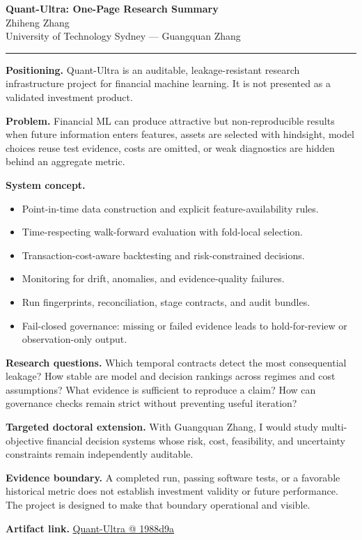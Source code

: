 \documentclass[11pt]{article}
\makeatletter
\newcommand{\ApplicantName}{Zhiheng Zhang}
\newcommand{\ApplicantGitHub}{\href{https://github.com/zhiheng-zhang-Mera/Quant-Ultra/tree/1988d9a8530da91a8158de864d098ea869098923}{Quant-Ultra @ 1988d9a}}
\makeatother
\begin{document}
\begin{center}
{\LARGE\bfseries Quant-Ultra: One-Page Research Summary}\\[0.25em]
{\large \ApplicantName}\\
University of Technology Sydney --- Guangquan Zhang
\end{center}
\vspace{0.35em}\hrule\vspace{0.65em}

\textbf{Positioning.} Quant-Ultra is an auditable, leakage-resistant research infrastructure project for financial machine learning. It is not presented as a validated investment product.

\textbf{Problem.} Financial ML can produce attractive but non-reproducible results when future information enters features, assets are selected with hindsight, model choices reuse test evidence, costs are omitted, or weak diagnostics are hidden behind an aggregate metric.

\textbf{System concept.}
\begin{itemize}
\item Point-in-time data construction and explicit feature-availability rules.
\item Time-respecting walk-forward evaluation with fold-local selection.
\item Transaction-cost-aware backtesting and risk-constrained decisions.
\item Monitoring for drift, anomalies, and evidence-quality failures.
\item Run fingerprints, reconciliation, stage contracts, and audit bundles.
\item Fail-closed governance: missing or failed evidence leads to hold-for-review or observation-only output.
\end{itemize}

\textbf{Research questions.} Which temporal contracts detect the most consequential leakage? How stable are model and decision rankings across regimes and cost assumptions? What evidence is sufficient to reproduce a claim? How can governance checks remain strict without preventing useful iteration?

\textbf{Targeted doctoral extension.} With Guangquan Zhang, I would study multi-objective financial decision systems whose risk, cost, feasibility, and uncertainty constraints remain independently auditable.

\textbf{Evidence boundary.} A completed run, passing software tests, or a favorable historical metric does not establish investment validity or future performance. The project is designed to make that boundary operational and visible.

\textbf{Artifact link.} \ApplicantGitHub
\end{document}
